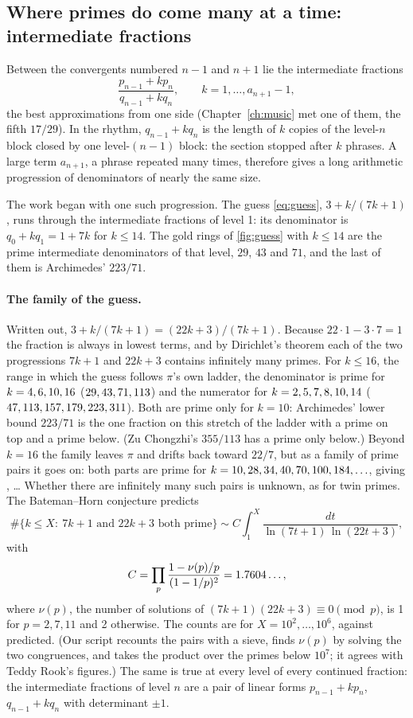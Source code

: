 \subsection{Where primes do come many at a time: intermediate fractions}

Between the convergents numbered $n - 1$ and $n + 1$ lie the intermediate fractions
\[
  \frac{p_{n-1} + kp_n}{q_{n-1} + kq_n}, \qquad k = 1, \dots, a_{n+1} - 1,
\]
the best approximations from one side (Chapter~\ref{ch:music} met one of them, the fifth $17/29$). In the rhythm, $q_{n-1} + kq_n$ is the length of $k$ copies of the level-$n$ block closed by one level-$(n-1)$ block: the section stopped after $k$ phrases. A large term $a_{n+1}$, a phrase repeated many times, therefore gives a long arithmetic progression of denominators of nearly the same size.

The work began with one such progression. The guess \eqref{eq:guess}, $3 + k/(7k+1)$, runs through the intermediate fractions of level 1: its denominator is $q_0 + kq_1 = 1 + 7k$ for $k \le 14$. The gold rings of \cref{fig:guess} with $k \le 14$ are the prime intermediate denominators of that level, $29$, $43$ and $71$, and the last of them is Archimedes' $223/71$.

\paragraph{The family of the guess.} Written out, $3 + k/(7k+1) = (22k+3)/(7k+1)$. Because $22\cdot1 - 3\cdot7 = 1$ the fraction is always in lowest terms, and by Dirichlet's theorem each of the two progressions $7k + 1$ and $22k + 3$ contains infinitely many primes. For $k \le 16$, the range in which the guess follows $\pi$'s own ladder, the denominator is prime for $k = 4, 6, 10, 16$ ($29, 43, 71, 113$) and the numerator for $k = 2, 5, 7, 8, 10, 14$ ($47, 113, 157, 179, 223, 311$). Both are prime only for $k = 10$: Archimedes' lower bound $223/71$ is the one fraction on this stretch of the ladder with a prime on top and a prime below. (Zu Chongzhi's $355/113$ has a prime only below.) Beyond $k = 16$ the family leaves $\pi$ and drifts back toward $22/7$, but as a family of prime pairs it goes on: both parts are prime for $k = 10, 28, 34, 40, 70, 100, 184, \ldots$, giving \FoFamBothF, \ldots{} Whether there are infinitely many such pairs is unknown, as for twin primes. The Bateman--Horn conjecture \citep{BatemanHorn1962} predicts
\[
  \#\{k \le X:\ 7k + 1 \text{ and } 22k + 3 \text{ both prime}\} \sim C\int_1^X\frac{dt}{\ln(7t + 1)\,\ln(22t + 3)},
\]
with
\[
  C = \prod_p\frac{1 - \nu(p)/p}{(1 - 1/p)^2} = 1.7604\ldots,
\]
where $\nu(p)$, the number of solutions of $(7k + 1)(22k + 3) \equiv 0 \pmod p$, is 1 for $p = 2, 7, 11$ and 2 otherwise. The counts are \FoBHCounts{} for $X = 10^2, \dots, 10^6$, against \FoBHPred{} predicted. (Our script recounts the pairs with a sieve, finds $\nu(p)$ by solving the two congruences, and takes the product over the primes below $10^7$; it agrees with Teddy Rook's figures.) The same is true at every level of every continued fraction: the intermediate fractions of level $n$ are a pair of linear forms $p_{n-1} + kp_n$, $q_{n-1} + kq_n$ with determinant $\pm1$.

